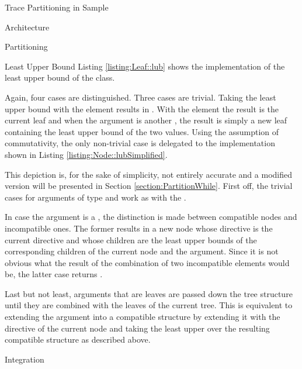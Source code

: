 \begin{chapter}{Trace Partitioning in Sample}
\begin{section}{Architecture}
\begin{subsection}{Partitioning}
\begin{subsubsection}{Least Upper Bound}
				Listing \ref{listing:Leaf::lub} shows the implementation of the least upper bound of the  class.
				
				

				Again, four cases are distinguished. Three cases are trivial. Taking the least upper bound with the  element results in . With the  element the result is the current leaf and when the argument is another , the result is simply a new leaf containing the least upper bound of the two values. Using the assumption of commutativity, the only non-trivial case is delegated to the  implementation shown in Listing \ref{listing:Node::lubSimplified}.

				

				This depiction is, for the sake of simplicity, not entirely accurate and a modified version will be presented in Section \ref{section:PartitionWhile}. First off, the trivial cases for arguments of type  and  work as with the . 
				
				In case the argument is a , the distinction is made between compatible nodes and incompatible ones. The former results in a new node whose directive is the current directive and whose children are the least upper bounds of the corresponding children of the current node and the argument. Since it is not obvious what the result of the combination of two incompatible elements would be, the latter case returns . 
				
				Last but not least, arguments that are leaves are passed down the tree structure until they are combined with the leaves of the current tree. This is equivalent to extending the argument into a compatible structure by extending it with the directive of the current node and taking the least upper over the resulting compatible structure as described above.
			\end{subsubsection}
		\end{subsection}
	\end{section}


	\begin{section}{Integration}
		\label{section:Integration}


\end{section}
\end{chapter}
